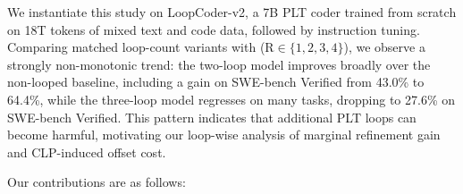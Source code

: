 \documentclass{llmxive}
\providecommand{\loopcount}{R}
\providecommand{\modelname}{LoopCoder-v2}
\begin{document}


We instantiate this study on \modelname{}, a 7B PLT coder trained from scratch on 18T tokens of mixed text and code data, followed by instruction tuning. Comparing matched loop-count variants with (\loopcount $\in \{1,2,3,4\}$), we observe a strongly non-monotonic trend: the two-loop model improves broadly over the non-looped baseline, including a gain on SWE-bench Verified from 43.0\% to 64.4\%, while the three-loop model regresses on many tasks, dropping to 27.6\% on SWE-bench Verified. This pattern indicates that additional PLT loops can become harmful, motivating our loop-wise analysis of marginal refinement gain and CLP-induced offset cost.

Our contributions are as follows:
\end{document}
